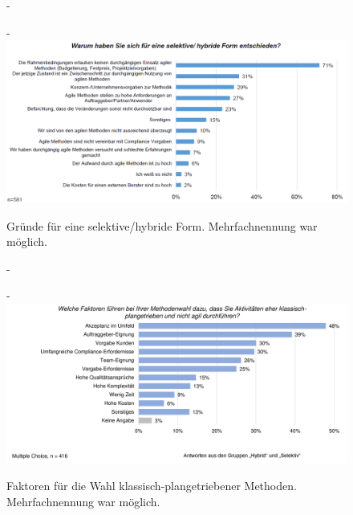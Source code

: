 \begin{figure}[h!]
	\begin{addmargin*}[0cm]{-\marginparwidth}
		\begin{addmargin*}[0cm]{-\marginparsep}
			\centering
			\includegraphics[width=1.25\textwidth]{Bilder/Kapitel-2/GruendeHybrid.png}
			\caption[Gründe für eine selektive/hybride Form]{Gründe für eine selektive/hybride Form. Mehrfachnennung war möglich. \cite[29]{kom17}}
			\label{fig:gruende_hybrid}
		\end{addmargin*}
	\end{addmargin*}
\end{figure}

\begin{figure}[h!]
	\begin{addmargin*}[0cm]{-\marginparwidth}
		\begin{addmargin*}[0cm]{-\marginparsep}
			\centering
			\includegraphics[width=1.25\textwidth]{Bilder/Kapitel-2/GruendeKlassisch.png}
			\caption[Faktoren für die Wahl klassisch-plangetriebener Methoden]{Faktoren für die Wahl klassisch-plangetriebener Methoden. Mehrfachnennung war möglich. \cite[30]{kom20}}
			\label{fig:gruende_klassisch}
		\end{addmargin*}
	\end{addmargin*}
\end{figure}

